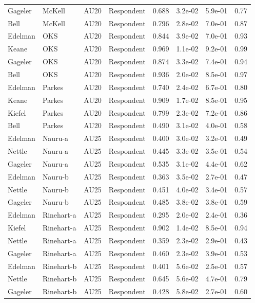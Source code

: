 \documentclass{monashthesis}
\begin{document}
\begin{center}
\begin{longtable}{llllllll}
Gageler & McKell & AU20 & Respondent & 0.688 & 3.2e-02 & 5.9e-01 & 0.77 \\
Bell & McKell & AU20 & Respondent & 0.796 & 2.8e-02 & 7.0e-01 & 0.87 \\
Edelman & OKS & AU20 & Respondent & 0.844 & 3.9e-02 & 7.0e-01 & 0.93 \\
Keane & OKS & AU20 & Respondent & 0.969 & 1.1e-02 & 9.2e-01 & 0.99 \\
Gageler & OKS & AU20 & Respondent & 0.874 & 3.3e-02 & 7.4e-01 & 0.94 \\
Bell & OKS & AU20 & Respondent & 0.936 & 2.0e-02 & 8.5e-01 & 0.97 \\
Edelman & Parkes & AU20 & Respondent & 0.740 & 2.4e-02 & 6.7e-01 & 0.80 \\
Keane & Parkes & AU20 & Respondent & 0.909 & 1.7e-02 & 8.5e-01 & 0.95 \\
Kiefel & Parkes & AU20 & Respondent & 0.799 & 2.3e-02 & 7.2e-01 & 0.86 \\
Bell & Parkes & AU20 & Respondent & 0.490 & 3.1e-02 & 4.0e-01 & 0.58 \\
Edelman & Nauru-a & AU25 & Respondent & 0.400 & 3.0e-02 & 3.2e-01 & 0.49 \\
Nettle & Nauru-a & AU25 & Respondent & 0.445 & 3.3e-02 & 3.5e-01 & 0.54 \\
Gageler & Nauru-a & AU25 & Respondent & 0.535 & 3.1e-02 & 4.4e-01 & 0.62 \\
Edelman & Nauru-b & AU25 & Respondent & 0.363 & 3.5e-02 & 2.7e-01 & 0.47 \\
Nettle & Nauru-b & AU25 & Respondent & 0.451 & 4.0e-02 & 3.4e-01 & 0.57 \\
Gageler & Nauru-b & AU25 & Respondent & 0.485 & 3.8e-02 & 3.8e-01 & 0.59 \\
Edelman & Rinehart-a & AU25 & Respondent & 0.295 & 2.0e-02 & 2.4e-01 & 0.36 \\
Kiefel & Rinehart-a & AU25 & Respondent & 0.902 & 1.4e-02 & 8.5e-01 & 0.94 \\
Nettle & Rinehart-a & AU25 & Respondent & 0.359 & 2.3e-02 & 2.9e-01 & 0.43 \\
Gageler & Rinehart-a & AU25 & Respondent & 0.460 & 2.3e-02 & 3.9e-01 & 0.53 \\
Edelman & Rinehart-b & AU25 & Respondent & 0.401 & 5.6e-02 & 2.5e-01 & 0.57 \\
Nettle & Rinehart-b & AU25 & Respondent & 0.645 & 5.6e-02 & 4.7e-01 & 0.79 \\
Gageler & Rinehart-b & AU25 & Respondent & 0.428 & 5.8e-02 & 2.7e-01 & 0.60 \\

\end{longtable}
\end{center}
\end{document}
